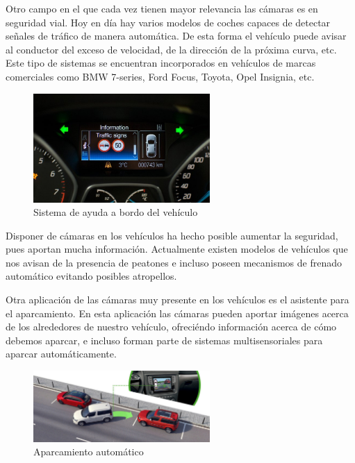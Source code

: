 Otro campo en el que cada vez tienen mayor relevancia las cámaras es en seguridad vial. Hoy en día hay varios modelos de coches capaces de detectar señales de tráfico de manera automática. De esta forma el vehículo puede avisar al conductor del exceso de velocidad, de la dirección de la próxima curva, etc. Este tipo de sistemas se encuentran incorporados en vehículos de marcas comerciales como BMW 7-series, Ford Focus, Toyota, Opel Insignia, etc.

\begin{figure}[H]
  \begin{center}
    \includegraphics[width=0.6\textwidth]{figures/Introduccion/deteccion_senales.jpg}
		\caption{Sistema de ayuda a bordo del vehículo}
		\label{fig.deteccion_senales}
		\end{center}
\end{figure}

Disponer de cámaras en los vehículos ha hecho posible aumentar la seguridad, pues aportan mucha información. Actualmente existen modelos de vehículos que nos avisan de la presencia de peatones e incluso poseen mecanismos de frenado automático evitando posibles atropellos.

Otra aplicación de las cámaras muy presente en los vehículos es el asistente para el aparcamiento.  En esta aplicación las cámaras pueden aportar imágenes acerca de los alrededores de nuestro vehículo, ofreciéndo información acerca de cómo debemos aparcar, e incluso forman parte de  sistemas multisensoriales para aparcar automáticamente.

\begin{figure}[H]
  \begin{center}
    \includegraphics[width=0.6\textwidth]{figures/Introduccion/aparcamiento_automatico.jpg}
		\caption{Aparcamiento automático}
		\label{fig.aparcamiento_automatico}
		\end{center}
\end{figure}

